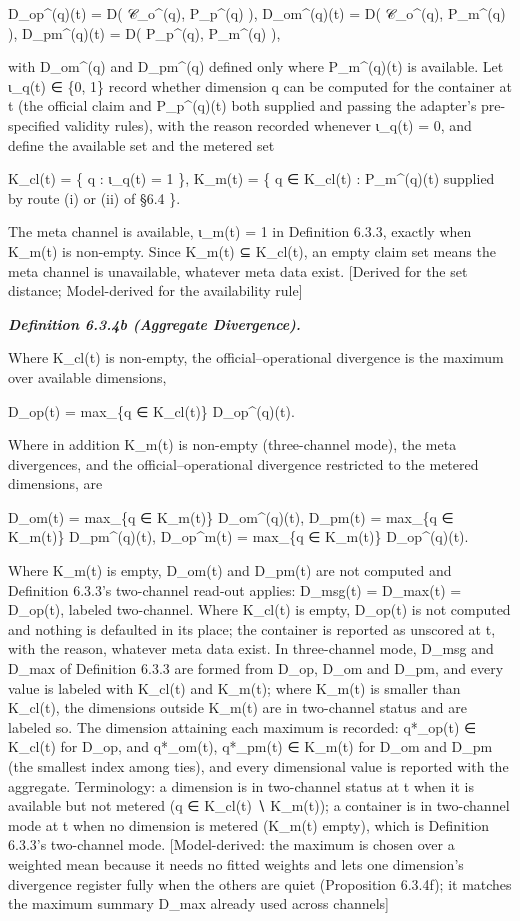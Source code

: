 \documentclass[
]{article}
\begin{document}
D\_op\^{}(q)(t) = D( 𝒞\_o\^{}(q), P\_p\^{}(q) ), D\_om\^{}(q)(t) = D(
𝒞\_o\^{}(q), P\_m\^{}(q) ), D\_pm\^{}(q)(t) = D( P\_p\^{}(q),
P\_m\^{}(q) ),

with D\_om\^{}(q) and D\_pm\^{}(q) defined only where P\_m\^{}(q)(t) is
available. Let ι\_q(t) ∈ \{0, 1\} record whether dimension q can be
computed for the container at t (the official claim and P\_p\^{}(q)(t)
both supplied and passing the adapter's pre-specified validity rules),
with the reason recorded whenever ι\_q(t) = 0, and define the available
set and the metered set

K\_cl(t) = \{ q : ι\_q(t) = 1 \}, K\_m(t) = \{ q ∈ K\_cl(t) :
P\_m\^{}(q)(t) supplied by route (i) or (ii) of §6.4 \}.

The meta channel is available, ι\_m(t) = 1 in Definition 6.3.3, exactly
when K\_m(t) is non-empty. Since K\_m(t) ⊆ K\_cl(t), an empty claim set
means the meta channel is unavailable, whatever meta data exist.
{[}Derived for the set distance; Model-derived for the availability
rule{]}

\emph{\textbf{Definition 6.3.4b (Aggregate Divergence).}}

Where K\_cl(t) is non-empty, the official--operational divergence is the
maximum over available dimensions,

D\_op(t) = max\_\{q ∈ K\_cl(t)\} D\_op\^{}(q)(t).

Where in addition K\_m(t) is non-empty (three-channel mode), the meta
divergences, and the official--operational divergence restricted to the
metered dimensions, are

D\_om(t) = max\_\{q ∈ K\_m(t)\} D\_om\^{}(q)(t), D\_pm(t) = max\_\{q ∈
K\_m(t)\} D\_pm\^{}(q)(t), D\_op\^{}m(t) = max\_\{q ∈ K\_m(t)\}
D\_op\^{}(q)(t).

Where K\_m(t) is empty, D\_om(t) and D\_pm(t) are not computed and
Definition 6.3.3's two-channel read-out applies: D\_msg(t) = D\_max(t) =
D\_op(t), labeled two-channel. Where K\_cl(t) is empty, D\_op(t) is not
computed and nothing is defaulted in its place; the container is
reported as unscored at t, with the reason, whatever meta data exist. In
three-channel mode, D\_msg and D\_max of Definition 6.3.3 are formed
from D\_op, D\_om and D\_pm, and every value is labeled with K\_cl(t)
and K\_m(t); where K\_m(t) is smaller than K\_cl(t), the dimensions
outside K\_m(t) are in two-channel status and are labeled so. The
dimension attaining each maximum is recorded: q*\_op(t) ∈ K\_cl(t) for
D\_op, and q*\_om(t), q*\_pm(t) ∈ K\_m(t) for D\_om and D\_pm (the
smallest index among ties), and every dimensional value is reported with
the aggregate. Terminology: a dimension is in two-channel status at t
when it is available but not metered (q ∈ K\_cl(t) ∖ K\_m(t)); a
container is in two-channel mode at t when no dimension is metered
(K\_m(t) empty), which is Definition 6.3.3's two-channel mode.
{[}Model-derived: the maximum is chosen over a weighted mean because it
needs no fitted weights and lets one dimension's divergence register
fully when the others are quiet (Proposition 6.3.4f); it matches the
maximum summary D\_max already used across channels{]}
\end{document}
